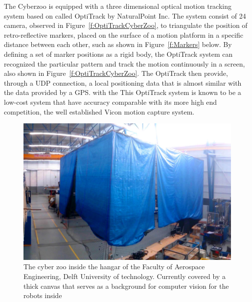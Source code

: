 The Cyberzoo is equipped with a three dimensional optical motion tracking system based on called OptiTrack by NaturalPoint Inc\cite{Hansen:14}\cite{Guadarrama-Olvera:14}. The system consist of 24 camera, observed in Figure~\ref{f:OptiTrackCyberZoo},  to triangulate the position of retro-reflective markers, placed on the surface of a motion platform in a specific distance between each other, such as shown in Figure~\ref{f:Markers} below. By defining a set of marker positions as a rigid body, the OptiTrack system can recognized the particular pattern and track the motion continuously in a screen, also shown in Figure~\ref{f:OptiTrackCyberZoo}. The OptiTrack then provide, through a UDP connection, a local positioning data that is almost similar with the data provided by a GPS. with the This OptiTrack system is known to be a low-cost system that have accuracy comparable with its more high end competition, the well established Vicon motion capture system\cite{Hansen:14}.

\begin{figure}[h]
\includegraphics[width=0.9\linewidth]{Figures/TheCyberZoo.png}
\centering
\caption{The cyber zoo inside the hangar of the Faculty of Aerospace Engineering, Delft University of technology. Currently covered by a thick canvas that serves as a background for computer vision for the robots inside}
\label{f:TheCyberZoo}
\end{figure}

